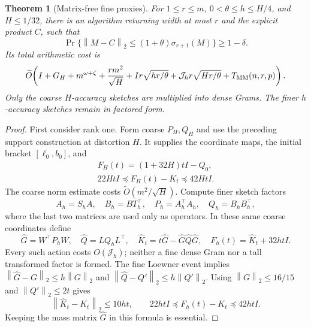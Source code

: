 \documentclass[11pt]{article}
\newtheorem{theorem}{Theorem}
\newcommand{\norm}[1]{\left\lVert#1\right\rVert}
\newcommand{\MM}{T_{\rm MM}}
\newcommand{\tO}{\widetilde O}
\begin{document}
\begin{theorem}[Matrix-free fine proxies]\label{thm:twolevel}
For \(1\leq r\leq m\), \(0<\theta\leq h\leq H/4\), and
\(H\leq1/32\), there is an algorithm returning width at most \(r\)
and the explicit product \(C\), such that
\[
 \Pr\{\norm{M-C}_2\leq(1+\theta)\sigma_{r+1}(M)\}\geq1-\delta.
\]
Its total arithmetic cost is
\begin{equation}\label{eq:twolevel}
 \tO\!\left(I+G_H+m^{\omega+\zeta}
    +\frac{rm^2}{\sqrt H}
    +Ir\sqrt{hr/\theta}
    +\mathcal J_h r\sqrt{Hr/\theta}
    +\MM(n,r,p)\right).
\end{equation}
Only the coarse \(H\)-accuracy sketches are multiplied into dense Grams.
The finer \(h\)-accuracy sketches remain in factored form.
\end{theorem}
\begin{proof}
First consider rank one. Form coarse \(P_H,Q_H\) and use the preceding
support construction at distortion \(H\). It supplies the coordinate maps,
the initial bracket \([\ell_0,b_0]\), and
\begin{gather*}
 F_H(t)=(1+32H)tI-Q_0,\\
 22HtI\preceq F_H(t)-K_t\preceq42HtI.
\end{gather*}
The coarse norm estimate costs \(\widetilde O(m^2/\sqrt H)\).
Compute finer sketch factors
\[
 A_h=S_hA,\quad B_h=BT_h^\top,\quad
 P_h=A_h^\top A_h,\quad Q_h=B_hB_h^\top,
\]
where the last two matrices are used only as operators. In these same
coarse coordinates define
\[
 \widehat G=W^\top P_hW,\quad \widehat Q=LQ_hL^\top,\quad
 \widehat K_t=t\widehat G-\widehat G\widehat Q\widehat G,\quad
 F_h(t)=\widehat K_t+32htI .
\]
Every such action costs \(O(\mathcal J_h)\); neither a fine dense Gram
nor a tall transformed factor is formed. The fine Loewner event implies
\(\norm{\widehat G-G}_2\leq h\norm G_2\) and
\(\norm{\widehat Q-Q'}_2\leq h\norm{Q'}_2\).
Using \(\norm G_2\leq16/15\) and \(\norm{Q'}_2\leq2t\) gives
\[
 \norm{\widehat K_t-K_t}_2\leq10ht,\qquad
 22htI\preceq F_h(t)-K_t\preceq42htI.                 \tag{*}
\]
Keeping the mass matrix \(\widehat G\) in this formula is essential.


\end{proof}
\end{document}
